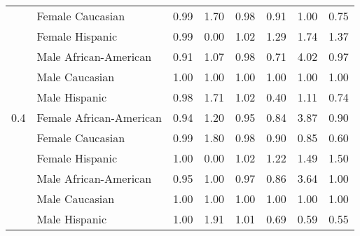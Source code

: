 \begin{tabular}{llrrrrrr}
    & Female Caucasian &             0.99 &           1.70 &                 0.98 &           0.91 &           1.00 &           0.75 \\
    & Female Hispanic &             0.99 &           0.00 &                 1.02 &           1.29 &           1.74 &           1.37 \\
    & Male African-American &             0.91 &           1.07 &                 0.98 &           0.71 &           4.02 &           0.97 \\
    & Male Caucasian &             1.00 &           1.00 &                 1.00 &           1.00 &           1.00 &           1.00 \\
    & Male Hispanic &             0.98 &           1.71 &                 1.02 &           0.40 &           1.11 &           0.74 \\
0.4 & Female African-American &             0.94 &           1.20 &                 0.95 &           0.84 &           3.87 &           0.90 \\
    & Female Caucasian &             0.99 &           1.80 &                 0.98 &           0.90 &           0.85 &           0.60 \\
    & Female Hispanic &             1.00 &           0.00 &                 1.02 &           1.22 &           1.49 &           1.50 \\
    & Male African-American &             0.95 &           1.00 &                 0.97 &           0.86 &           3.64 &           1.00 \\
    & Male Caucasian &             1.00 &           1.00 &                 1.00 &           1.00 &           1.00 &           1.00 \\
    & Male Hispanic &             1.00 &           1.91 &                 1.01 &           0.69 &           0.59 &           0.55 \\
\bottomrule
\end{tabular}

